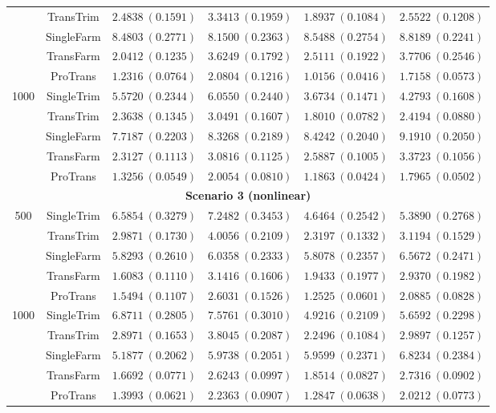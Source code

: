 \documentclass[12pt]{article}
\begin{document}
\begin{table}[!ht]
\begin{tabular}{cccccc}
& TransTrim   & $2.4838\ (0.1591)$ & $3.3413\ (0.1959)$ & $1.8937\ (0.1084)$ & $2.5522\ (0.1208)$ \\
& SingleFarm  & $8.4803\ (0.2771)$ & $8.1500\ (0.2363)$ & $8.5488\ (0.2754)$ & $8.8189\ (0.2241)$ \\
& TransFarm   & $2.0412\ (0.1235)$ & $3.6249\ (0.1792)$ & $2.5111\ (0.1922)$ & $3.7706\ (0.2546)$ \\
& ProTrans    & $\bm{1.2316}\ (0.0764)$ & $\bm{2.0804}\ (0.1216)$ & $\bm{1.0156}\ (0.0416)$ & $\bm{1.7158}\ (0.0573)$ \\
\hline
\multirow{5}{*}{1000}
& SingleTrim  & $5.5720\ (0.2344)$ & $6.0550\ (0.2440)$ & $3.6734\ (0.1471)$ & $4.2793\ (0.1608)$ \\
& TransTrim   & $2.3638\ (0.1345)$ & $3.0491\ (0.1607)$ & $1.8010\ (0.0782)$ & $2.4194\ (0.0880)$ \\
& SingleFarm  & $7.7187\ (0.2203)$ & $8.3268\ (0.2189)$ & $8.4242\ (0.2040)$ & $9.1910\ (0.2050)$ \\
& TransFarm   & $2.3127\ (0.1113)$ & $3.0816\ (0.1125)$ & $2.5887\ (0.1005)$ & $3.3723\ (0.1056)$ \\
& ProTrans    & $\bm{1.3256}\ (0.0549)$ & $\bm{2.0054}\ (0.0810)$ & $\bm{1.1863}\ (0.0424)$ & $\bm{1.7965}\ (0.0502)$ \\
        \hline
         \multicolumn{6}{c}{\textbf{Scenario 3 (nonlinear)}}\\
        \hline
        \multirow{5}{*}{500}
& SingleTrim  & $6.5854\ (0.3279)$  & $7.2482\ (0.3453)$ & $4.6464\ (0.2542)$ & $5.3890\ (0.2768)$ \\
& TransTrim   & $2.9871\ (0.1730)$  & $4.0056\ (0.2109)$  & $2.3197\ (0.1332)$ & $3.1194\ (0.1529)$ \\
& SingleFarm  & $5.8293\ (0.2610)$ & $6.0358\ (0.2333)$ & $5.8078\ (0.2357)$& $6.5672\ (0.2471)$  \\
& TransFarm   & $1.6083\ (0.1110)$ & $3.1416\ (0.1606)$ & $1.9433\ (0.1977)$ & $2.9370\ (0.1982)$  \\
& ProTrans    & $\bm{1.5494}\ (0.1107)$ & $\bm{2.6031}\ (0.1526)$  & $\bm{1.2525}\ (0.0601)$  & $\bm{2.0885}\ (0.0828)$  \\
\hline
\multirow{5}{*}{1000}
& SingleTrim  & $6.8711\ (0.2805)$ & $7.5761\ (0.3010)$ & $4.9216\ (0.2109)$ & $5.6592\ (0.2298)$  \\
& TransTrim   & $2.8971\ (0.1653)$ & $3.8045\ (0.2087)$ & $2.2496\ (0.1084)$ & $2.9897\ (0.1257)$ \\
& SingleFarm  & $5.1877\ (0.2062)$  & $5.9738\ (0.2051)$  & $5.9599\ (0.2371)$ & $6.8234\ (0.2384)$ \\
& TransFarm   & $1.6692\ (0.0771)$  & $2.6243\ (0.0997)$ & $1.8514\ (0.0827)$  & $2.7316\ (0.0902)$  \\
& ProTrans    & $\bm{1.3993}\ (0.0621)$  & $\bm{2.2363}\ (0.0907)$ & $\bm{1.2847}\ (0.0638)$ & $\bm{2.0212}\ (0.0773)$ \\
        \bottomrule
    \end{tabular}
\end{table}
\end{document}
